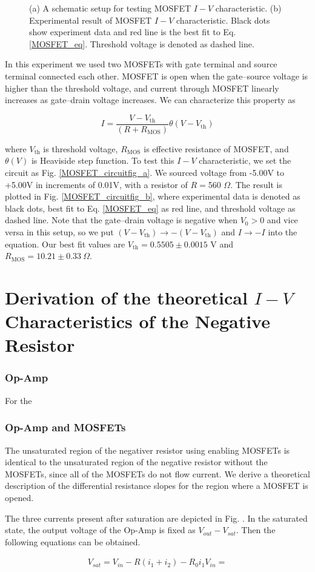 \documentclass[%
 aip,
amsmath,amssymb,
reprint,
]{revtex4-1}
\begin{document}
\begin{figure}[!htbp]
\caption{(a) A schematic setup for testing MOSFET $I-V$ characteristic. (b) Experimental result of MOSFET $I-V$ characteristic. Black dots show experiment data and red line is the best fit to Eq. \ref{MOSFET_eq}. Threshold voltage is denoted as dashed line.} \label{MOSFET_circuitfig}
\end{figure}

In this experiment we used two MOSFETs with gate terminal and source terminal connected each other.
MOSFET is open when the gate--source voltage is higher than the threshold voltage, and current through MOSFET linearly increases as gate--drain voltage increases.
We can characterize this property as

\begin{equation}
I=\frac{V-V_{\textrm{th}}}{(R+R_{\textrm{MOS}})}\theta(V-V_{\textrm{th}})
\label{MOSFET_eq}
\end{equation}

\noindent where $V_{\textrm{th}}$ is threshold voltage, $R_{\textrm{MOS}}$ is effective resistance of MOSFET, and $\theta(V)$ is Heaviside step function.
To test this $I-V$ characteristic, we set the circuit as Fig. \ref{MOSFET_circuitfig_a}.
We sourced voltage from -5.00V to +5.00V in increments of 0.01V, with a resistor of $R=$560 $\Omega$.
The result is plotted in Fig. \ref{MOSFET_circuitfig_b}, where experimental data is denoted as black dots, best fit to Eq. \ref{MOSFET_eq} as red line, and threshold voltage as dashed line.
Note that the gate--drain voltage is negative when $V_{0}>0$ and vice versa in this setup, so we put $(V-V_{\textrm{th}})\rightarrow-(V-V_{\textrm{th}})$ and $I\rightarrow -I$ into the equation.
Our best fit values are $V_{\textrm{th}}=0.5505\pm0.0015$ V and $R_{\textrm{MOS}}=10.21\pm0.33\>\Omega$.


\section{Derivation of the theoretical $I-V$ Characteristics of the Negative Resistor}
\subsubsection{\label{opampiv}Op-Amp}
For the 

\subsubsection{\label{opamp_mosfetiv}Op-Amp and MOSFETs}
The unsaturated region of the negativer resistor using enabling MOSFETs is identical to the unsaturated region of the negative resistor without the MOSFETs, since all of the MOSFETs do not flow current. We derive a theoretical description of the differential resistance slopes for the region where a MOSFET is opened. 

The three currents present after saturation are depicted in Fig. . In the saturated state, the output voltage of the Op-Amp is fixed as $V_{out}-V_{sat}$. Then the following equations can be obtained.

\begin{eqnarray*}
  V_{sat} = V_{in} - R(i_1+i_2)-R_0i_1
  V_{in} = 
\end{eqnarray*}
\end{document}

